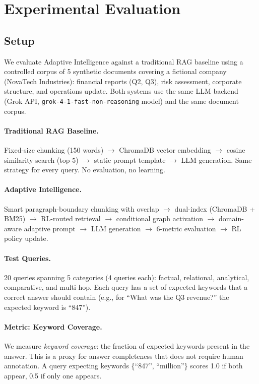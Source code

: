 \documentclass[11pt]{article}
\begin{document}
\section{Experimental Evaluation}
\label{sec:experiments}

\subsection{Setup}

We evaluate Adaptive Intelligence against a traditional RAG baseline using a controlled corpus of 5 synthetic documents covering a fictional company (NovaTech Industries): financial reports (Q2, Q3), risk assessment, corporate structure, and operations update. Both systems use the same LLM backend (Grok API, \texttt{grok-4-1-fast-non-reasoning} model) and the same document corpus.

\paragraph{Traditional RAG Baseline.} Fixed-size chunking (150 words) $\rightarrow$ ChromaDB vector embedding $\rightarrow$ cosine similarity search (top-5) $\rightarrow$ static prompt template $\rightarrow$ LLM generation. Same strategy for every query. No evaluation, no learning.

\paragraph{Adaptive Intelligence.} Smart paragraph-boundary chunking with overlap $\rightarrow$ dual-index (ChromaDB + BM25) $\rightarrow$ RL-routed retrieval $\rightarrow$ conditional graph activation $\rightarrow$ domain-aware adaptive prompt $\rightarrow$ LLM generation $\rightarrow$ 6-metric evaluation $\rightarrow$ RL policy update.

\paragraph{Test Queries.} 20 queries spanning 5 categories (4 queries each): factual, relational, analytical, comparative, and multi-hop. Each query has a set of expected keywords that a correct answer should contain (e.g., for ``What was the Q3 revenue?'' the expected keyword is ``847'').

\paragraph{Metric: Keyword Coverage.} We measure \textit{keyword coverage}: the fraction of expected keywords present in the answer. This is a proxy for answer completeness that does not require human annotation. A query expecting keywords \{``847'', ``million''\} scores 1.0 if both appear, 0.5 if only one appears.
\end{document}
